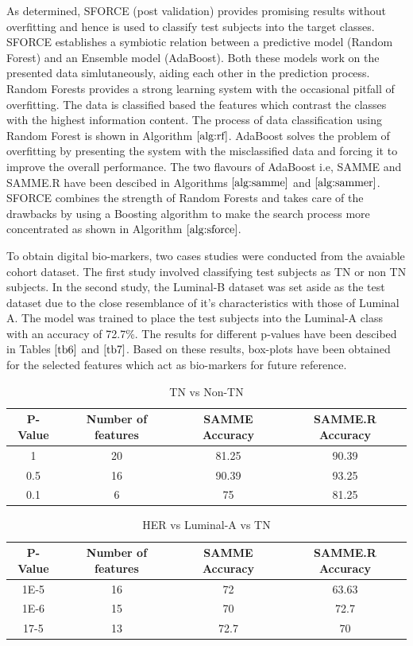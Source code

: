 \documentclass[10pt,journal,compsoc]{IEEEtran}
\begin{document}
As determined, SFORCE (post validation) provides promising results without overfitting and hence is used to classify test subjects into the target classes. SFORCE establishes a symbiotic relation between a predictive model (Random Forest) and an Ensemble model (AdaBoost). Both these models work on the presented data simlutaneously, aiding each other in the prediction process. Random Forests provides a strong learning system with the occasional pitfall of overfitting. The data is classified based the features which contrast the classes with the highest information content. The process of data classification using Random Forest is shown in Algorithm $\ref{alg:rf}$. AdaBoost solves the problem of overfitting by presenting the system with the misclassified data and forcing it to improve the overall performance. The two flavours of AdaBoost i.e, SAMME and SAMME.R have been descibed in Algorithms $\ref{alg:samme}$ and $\ref{alg:sammer}$. SFORCE combines the strength of Random Forests and takes care of the  drawbacks by using a Boosting algorithm to make the search process more concentrated as shown in Algorithm $\ref{alg:sforce}$. 

To obtain digital bio-markers, two cases studies were conducted from the avaiable cohort dataset. The first study involved classifying test subjects as TN or non TN subjects. In the second study, the Luminal-B dataset was set aside as the test dataset due to the close resemblance of it's characteristics with those of Luminal A. The model was trained to place the test subjects into the Luminal-A class with an accuracy of 72.7\%. The results for different p-values have been descibed in Tables $\ref{tb6}$ and $\ref{tb7}$. Based on these results, box-plots have been obtained for the selected features which act as bio-markers for future reference.


\begin{table}[!b]
\centering
\caption{TN vs Non-TN}
\label{tb6}
\begin{tabular}{| c | c | c | c |}
\hline
P-Value & Number of features & SAMME Accuracy & SAMME.R Accuracy\\
\hline
1&20&81.25&90.39\\
\hline
0.5&16&90.39&93.25\\
\hline
0.1&6&75&81.25\\
\hline
\end{tabular}
\end{table}

\begin{table}[!b]
\centering
\caption{HER vs Luminal-A vs TN}
\label{tb7}
\begin{tabular}{| c | c | c | c |}
\hline
P-Value & Number of features & SAMME Accuracy & SAMME.R Accuracy\\
\hline
1E-5&16&72&63.63\\
\hline
1E-6&15&70&72.7\\
\hline
17-5&13&72.7&70\\
\hline
\end{tabular}
\end{table}
\end{document}
